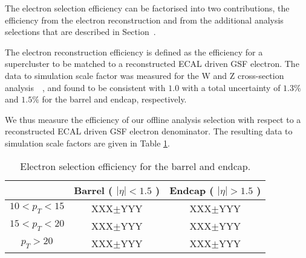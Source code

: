 
The electron selection efficiency can be factorised into two contributions,
the efficiency from the electron reconstruction and from the additional
analysis selections that are described in Section~\label{sec:sel_electrons}.

The electron reconstruction efficiency is defined as the efficiency for a
supercluster to be matched to a reconstructed ECAL driven GSF electron.
The data to simulation scale factor was measured for the W and Z cross-section
analysis~\cite{VBTFCrossSectionNote}~\cite{ref:tagprobe_mit_w},
and found to be consistent with $1.0$ with a total uncertainty of
$1.3\%$ and $1.5\%$ for the barrel and endcap, respectively.

We thus measure the efficiency of our offline analysis selection 
with respect to a reconstructed ECAL driven GSF electron denominator. 
The resulting data to simulation scale factors are given in Table \ref{tab:eff_ele_offline}.

\begin{table}[!ht]
\begin{center}
\begin{tabular}{c|c|c} 
\hline
              & Barrel ( $|\eta|<1.5$ )  & Endcap ( $|\eta|>1.5$ )  \\ 
\hline
$10<p_{T}<15$ & XXX$\pm$YYY & XXX$\pm$YYY                 \\ \hline
$15<p_{T}<20$ & XXX$\pm$YYY & XXX$\pm$YYY            \\ \hline
$p_T>20$   & XXX$\pm$YYY & XXX$\pm$YYY \\ \hline
\end{tabular}
\caption{Electron selection efficiency for the barrel and endcap.
\label{tab:eff_ele_offline}}
\end{center}
\end{table}
